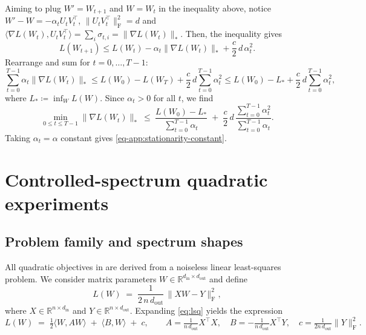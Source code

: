 \documentclass{article}
\theoremstyle{plain}
\theoremstyle{definition}
\theoremstyle{remark}
\newcommand{\R}{\mathbb{R}}
\newcommand{\loss}{L}
\newcommand{\stepsize}{\alpha}
\newcommand{\Lips}{{c}} %
\newcommand{\svnn}{{\sigma}} %
\begin{document}
Aiming to plug $W'=W_{t+1}$ and $W=W_t$ in the inequality above, notice $W'-W = -\stepsize_t U_t^{}V_t^\top$,
$\|U_t^{}V_t^\top\|_{\mathrm{F}}^2 = d$
and 
$\langle \nabla \loss(W_t), U_t^{}V_t^\top\rangle = \sum_i \svnn_{t,i} = \|\nabla \loss(W_t)\|_\ast$.
Then, the inequality gives
\begin{equation}
  \loss(W_{t+1}) \le \loss(W_t) - \stepsize_t \|\nabla \loss(W_t)\|_\ast + \frac{\Lips}{2}\,d\,\stepsize_t^2.
  \label{eq:descent-lemma-nuclear}
\end{equation}
Rearrange and sum for $t=0,\dots,T-1$:
\[
\sum_{t=0}^{T-1}\stepsize_t \|\nabla\loss(W_t)\|_\ast
\le \loss(W_0)-\loss(W_T) + \frac{\Lips}{2}\,d\sum_{t=0}^{T-1}\stepsize_t^2
\le \loss(W_0)-\loss_\ast + \frac{\Lips}{2}\,d\sum_{t=0}^{T-1}\stepsize_t^2,
\]
where $\loss_\ast\coloneqq \inf_W \loss(W)$.
Since $\stepsize_t>0$ for all $t$, we find
\[
\min_{0\le t\le T-1}\|\nabla \loss(W_t)\|_\ast
\ \le\
\frac{\loss(W_0)-\loss_\ast}{\sum_{t=0}^{T-1}\stepsize_t}
\;+\;
\frac{\Lips}{2}\,d\,\frac{\sum_{t=0}^{T-1}\stepsize_t^2}{\sum_{t=0}^{T-1}\stepsize_t}.
\]
Taking $\stepsize_t=\stepsize$ constant gives \eqref{eq-app:stationarity-constant}.

\section{Controlled-spectrum quadratic experiments}
\label{app:controlled-spectrum}

\subsection{Problem family and spectrum shapes}
\label{app:controlled-spectrum-setup}


All quadratic objectives in  are derived from
a noiseless linear least-squares problem.
We consider matrix parameters $W\in\R^{d_{\mathrm{in}}\times d_{\mathrm{out}}}$
and define
\begin{equation}
  \loss(W)
  \;=\;
  \frac{1}{2\,n\,d_{\mathrm{out}}}\,\|XW - Y\|_{\mathrm{F}}^2,
  \label{eq:lsq}
\end{equation}
where $X\in\R^{n\times d_{\mathrm{in}}}$ and $Y\in\R^{n\times d_{\mathrm{out}}}$.
Expanding \eqref{eq:lsq} yields the expression
\[
\loss(W)
\;=\;
\tfrac12\langle W, A W\rangle
\;+\;
\langle B, W\rangle
\;+\;
c,
\qquad
A=\tfrac{1}{n\,d_{\mathrm{out}}} X^\top X,
\quad
B=-\tfrac{1}{n\,d_{\mathrm{out}}} X^\top Y,
\quad
c=\tfrac{1}{2n\,d_{\mathrm{out}}}\|Y\|_{\mathrm{F}}^2 .
\]
\end{document}
